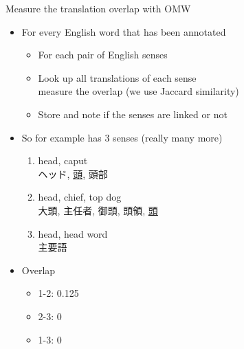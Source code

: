\documentclass[dvipsnames]{beamer}
\begin{document}
\begin{frame}{Measure the translation overlap with OMW}

  \begin{itemize}
  \item For every English word that has been annotated
    \begin{itemize}
    \item For each pair of English senses
    \item Look up all translations of each sense
      \\ measure the overlap (we use Jaccard similarity)
      \item Store and note if the senses are linked or not
    \end{itemize}
  \item So for example  has 3 senses (really many more)
    \begin{enumerate}
    \item head, caput
      \\ ヘッド, \ul{頭}, 頭部 
    \item head, chief, top dog
      \\ 大頭, 主任者, 御頭, 頭領, \ul{頭}
    \item head,  head word
      \\ 主要語
    \end{enumerate}
  \item Overlap
    \begin{itemize}
    \item 1-2: 0.125 %
    \item 2-3: 0
    \item 1-3: 0
    \end{itemize}
  \end{itemize}
  

\end{frame}
\end{document}
